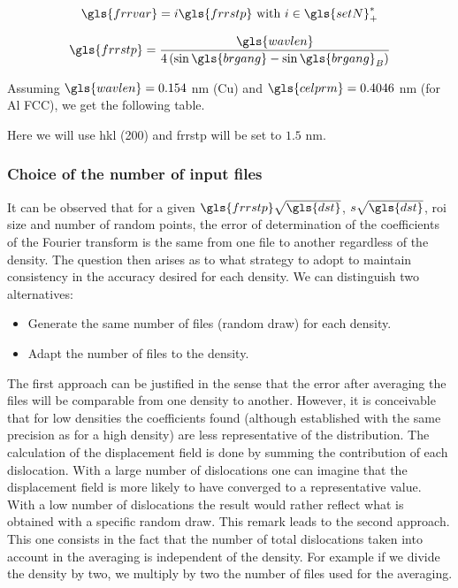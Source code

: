 \begin{equation}\label{eq:fourier-L-step}
\gls{frrvar} = i \gls{frrstp} \ \text{with} \ i \in \gls{setN}^*_+
\end{equation}

\begin{equation}\label{eq:fourier-a3}
\gls{frrstp} = \frac{\gls{wavlen}}{4 \left( \sin \gls{brgang} - \sin \gls{brgang}_B \right)}
\end{equation}

\medskip

Assuming \( \gls{wavlen} = 0.154 \) nm (Cu) and \( \gls{celprm} =  0.4046 \) nm  (for Al FCC), we get the following table.

\medskip

{\renewcommand{\arraystretch}{1.6}




\bigskip

Here we will use hkl (200) and \gls{frrstp} will be set to \( 1.5 \) nm.

\subsubsection{Choice of the number of input files}

It can be observed that for a given \( \gls{frrstp} \sqrt{\gls{dst}} \), \( s \sqrt{\gls{dst}} \), \gls{roi} size and number of random points, the error of determination of the coefficients of the Fourier transform is the same from one file to another regardless of the density.
The question then arises as to what strategy to adopt to maintain consistency in the accuracy desired for each density.
We can distinguish two alternatives:
\begin{itemize}
\item Generate the same number of files (random draw) for each density.
\item Adapt the number of files to the density.
\end{itemize}
The first approach can be justified in the sense that the error after averaging the files will be comparable from one density to another.
However, it is conceivable that for low densities the coefficients found (although established with the same precision as for a high density) are less representative of the distribution.
The calculation of the displacement field is done by summing the contribution of each dislocation.
With a large number of dislocations one can imagine that the displacement field is more likely to have converged to a representative value.
With a low number of dislocations the result would rather reflect what is obtained with a specific random draw.
This remark leads to the second approach.
This one consists in the fact that the number of total dislocations taken into account in the averaging is independent of the density.
For example if we divide the density by two, we multiply by two the number of files used for the averaging.

}
